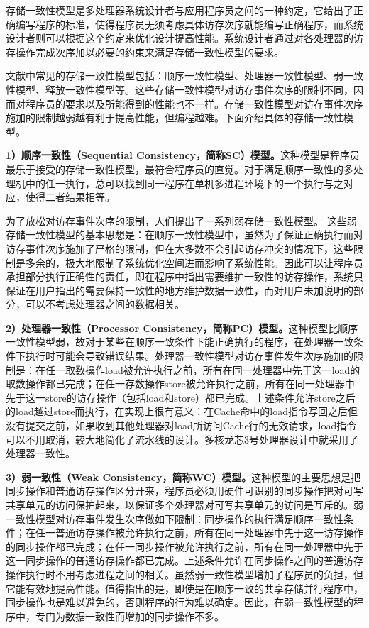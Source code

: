 \documentclass[]{ctexbook}
\begin{document}
存储一致性模型是多处理器系统设计者与应用程序员之间的一种约定，它给出了正确编写程序的标准，使得程序员无须考虑具体访存次序就能编写正确程序，而系统设计者则可以根据这个约定来优化设计提高性能。系统设计者通过对各处理器的访存操作完成次序加以必要的约束来满足存储一致性模型的要求。

文献中常见的存储一致性模型包括：顺序一致性模型、处理器一致性模型、弱一致性模型、释放一致性模型等。这些存储一致性模型对访存事件次序的限制不同，因而对程序员的要求以及所能得到的性能也不一样。存储一致性模型对访存事件次序施加的限制越弱越有利于提高性能，但编程越难。下面介绍具体的存储一致性模型。

\textbf{1）顺序一致性（Sequential Consistency，简称SC）模型。}这种模型是程序员最乐于接受的存储一致性模型，最符合程序员的直觉。对于满足顺序一致性的多处理机中的任一执行，总可以找到同一程序在单机多进程环境下的一个执行与之对应，使得二者结果相等。

为了放松对访存事件次序的限制，人们提出了一系列弱存储一致性模型。 这些弱存储一致性模型的基本思想是：在顺序一致性模型中，虽然为了保证正确执行而对访存事件次序施加了严格的限制，但在大多数不会引起访存冲突的情况下，这些限制是多余的，极大地限制了系统优化空间进而影响了系统性能。因此可以让程序员承担部分执行正确性的责任，即在程序中指出需要维护一致性的访存操作，系统只保证在用户指出的需要保持一致性的地方维护数据一致性，而对用户未加说明的部分，可以不考虑处理器之间的数据相关。

\textbf{2）处理器一致性（Processor Consistency，简称PC）模型。}这种模型比顺序一致性模型弱，故对于某些在顺序一致条件下能正确执行的程序，在处理器一致条件下执行时可能会导致错误结果。处理器一致性模型对访存事件发生次序施加的限制是：在任一取数操作load被允许执行之前，所有在同一处理器中先于这一load的取数操作都已完成；在任一存数操作store被允许执行之前，所有在同一处理器中先于这一store的访存操作（包括load和store）都已完成。上述条件允许store之后的load越过store而执行，在实现上很有意义：在Cache命中的load指令写回之后但没有提交之前，如果收到其他处理器对load所访问Cache行的无效请求，load指令可以不用取消，较大地简化了流水线的设计。多核龙芯3号处理器设计中就采用了处理器一致性。

\textbf{3）弱一致性（Weak Consistency，简称WC）模型。}这种模型的主要思想是把同步操作和普通访存操作区分开来，程序员必须用硬件可识别的同步操作把对可写共享单元的访问保护起来，以保证多个处理器对可写共享单元的访问是互斥的。弱一致性模型对访存事件发生次序做如下限制：同步操作的执行满足顺序一致性条件；在任一普通访存操作被允许执行之前，所有在同一处理器中先于这一访存操作的同步操作都已完成；在任一同步操作被允许执行之前，所有在同一处理器中先于这一同步操作的普通访存操作都已完成。上述条件允许在同步操作之间的普通访存操作执行时不用考虑进程之间的相关。虽然弱一致性模型增加了程序员的负担，但它能有效地提高性能。值得指出的是，即使是在顺序一致的共享存储并行程序中，同步操作也是难以避免的，否则程序的行为难以确定。因此，在弱一致性模型的程序中，专门为数据一致性而增加的同步操作不多。
\end{document}

